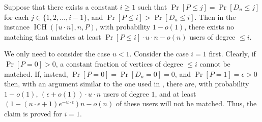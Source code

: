 \documentclass[11pt]{article}
\DeclareMathOperator*{\irregularcuckoohashing}{ICH}
\begin{document}
\begin{corollaryrep}
Suppose that there exists a constant $i \ge 1$ such that $\Pr[P\leq j] = \Pr[D_u \le j]$ for each $j \in \{1,2,\ldots,i-1\}$, and $\Pr[P\leq i] > \Pr[D_u \le i]$. Then in the instance $\irregularcuckoohashing(\lceil u\cdot n\rceil,n,P)$, with probability $1-o(1)$, there exists no matching that matches at least $\Pr[P \leq i] \cdot u \cdot n - o(n)$ users of degree $\le i$.
\end{corollaryrep}
\begin{appendixproof}
We only need to consider the case $u<1$. Consider the case $i=1$ first. Clearly, if $\Pr[P=0]>0$, a constant fraction of vertices of degree $\leq i$ cannot be matched. If, instead, $\Pr[P=0]=\Pr[D_u=0]=0$, and $\Pr[P=1] = \epsilon > 0$ then, with an argument similar to the one used in , there are, with probability $1-o(1)$, $(\epsilon+o(1))\cdot u\cdot n$ users of degree $1$, and at least $(1-(u\cdot \epsilon+1)e^{-u\cdot \epsilon})n - o(n)$ of these users will not be matched. Thus, the claim is proved for $i=1$.


\end{appendixproof}
\end{document}
